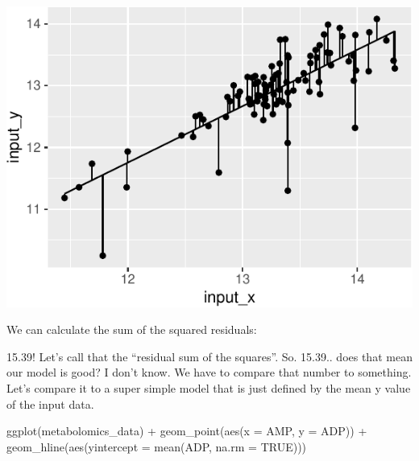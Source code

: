 \documentclass[
]{krantz}
\newenvironment{Shaded}{\begin{snugshade}}{\end{snugshade}}
\newcommand{\AttributeTok}[1]{\textcolor[rgb]{0.77,0.63,0.00}{#1}}
\newcommand{\ConstantTok}[1]{\textcolor[rgb]{0.00,0.00,0.00}{#1}}
\newcommand{\DecValTok}[1]{\textcolor[rgb]{0.00,0.00,0.81}{#1}}
\newcommand{\DocumentationTok}[1]{\textcolor[rgb]{0.56,0.35,0.01}{\textbf{\textit{#1}}}}
\newcommand{\FunctionTok}[1]{\textcolor[rgb]{0.00,0.00,0.00}{#1}}
\newcommand{\NormalTok}[1]{#1}
\newcommand{\SpecialCharTok}[1]{\textcolor[rgb]{0.00,0.00,0.00}{#1}}
\begin{document}
\begin{center}\includegraphics[width=1\linewidth]{index_files/figure-latex/unnamed-chunk-127-1} \end{center}

We can calculate the sum of the squared residuals:

\begin{Shaded}
\end{Shaded}

15.39! Let's call that the ``residual sum of the squares''. So. 15.39.. does that mean our model is good? I don't know. We have to compare that number to something. Let's compare it to a super simple model that is just defined by the mean y value of the input data.

\begin{Shaded}
\begin{Highlighting}[]
\FunctionTok{ggplot}\NormalTok{(metabolomics\_data) }\SpecialCharTok{+}
  \FunctionTok{geom\_point}\NormalTok{(}\FunctionTok{aes}\NormalTok{(}\AttributeTok{x =}\NormalTok{ AMP, }\AttributeTok{y =}\NormalTok{ ADP)) }\SpecialCharTok{+}
  \FunctionTok{geom\_hline}\NormalTok{(}\FunctionTok{aes}\NormalTok{(}\AttributeTok{yintercept =} \FunctionTok{mean}\NormalTok{(ADP, }\AttributeTok{na.rm =} \ConstantTok{TRUE}\NormalTok{)))}
\end{Highlighting}
\end{Shaded}
\end{document}
